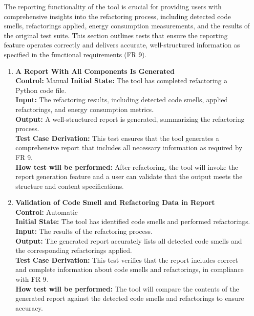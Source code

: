 \documentclass[12pt, titlepage]{article}
\begin{document}
\medskip

\noindent
The reporting functionality of the tool is crucial for providing users with comprehensive insights into the refactoring process, including detected code smells, refactorings applied, energy consumption measurements, and the results of the original test suite. This section outlines tests that ensure the reporting feature operates correctly and delivers accurate, well-structured information as specified in the functional requirements (FR 9). 
		
\begin{enumerate}[label={\bf \textcolor{Maroon}{test-FR-RP-\arabic*}}, wide=0pt, font=\itshape]
  \item \textbf{A Report With All Components Is Generated}\\[2mm]
    \textbf{Control:} Manual
    \textbf{Initial State:} The tool has completed refactoring a Python code file.\\
    \textbf{Input:} The refactoring results, including detected code smells, applied refactorings, and energy consumption metrics.\\
    \textbf{Output:} A well-structured report is generated, summarizing the refactoring process.\\[2mm]
    \textbf{Test Case Derivation:} This test ensures that the tool generates a comprehensive report that includes all necessary information as required by FR 9.\\[2mm]
    \textbf{How test will be performed:} After refactoring, the tool will invoke the report generation feature and a user can validate that the output meets the structure and content specifications.

  \item \textbf{Validation of Code Smell and Refactoring Data in Report}\\[2mm]
    \textbf{Control:} Automatic \\
    \textbf{Initial State:} The tool has identified code smells and performed refactorings.\\
    \textbf{Input:} The results of the refactoring process.\\
    \textbf{Output:} The generated report accurately lists all detected code smells and the corresponding refactorings applied.\\[2mm]
    \textbf{Test Case Derivation:} This test verifies that the report includes correct and complete information about code smells and refactorings, in compliance with FR 9.\\[2mm]
    \textbf{How test will be performed:} The tool will compare the contents of the generated report against the detected code smells and refactorings to ensure accuracy.


\end{enumerate}
\end{document}
